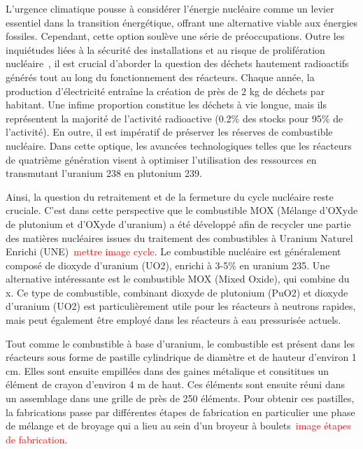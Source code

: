 L'urgence climatique pousse à considérer l'énergie nucléaire comme un levier essentiel dans la transition énergétique, offrant une alternative viable aux énergies fossiles. Cependant, cette option soulève une série de préoccupations. Outre les inquiétudes liées à la sécurité des installations et au risque de prolifération nucléaire~\cite{npt_resolution}, il est crucial d'aborder la question des déchets hautement radioactifs générés tout au long du fonctionnement des réacteurs. Chaque année, la production d'électricité entraîne la création de près de 2 kg de déchets par habitant. Une infime proportion constitue les déchets à vie longue, mais ils représentent la majorité de l'activité radioactive (0.2\% des stocks pour 95\% de l'activité). En outre, il est impératif de préserver les réserves de combustible nucléaire. Dans cette optique, les avancées technologiques telles que les réacteurs de quatrième génération visent à optimiser l'utilisation des ressources en transmutant l'uranium 238 en plutonium 239.

Ainsi, la question du retraitement et de la fermeture du cycle nucléaire reste cruciale. C'est dans cette perspective que le combustible MOX (Mélange d’OXyde de plutonium et d’OXyde d’uranium) a été développé afin de recycler une partie des matières nucléaires issues du traitement des combustibles à Uranium Naturel Enrichi (UNE)~\textcolor{red}{mettre image cycle}.
Le combustible nucléaire est généralement composé de dioxyde d'uranium (UO2), enrichi à 3-5\% en uranium 235. Une alternative intéressante est le combustible MOX (Mixed Oxide), qui combine du x.
Ce type de combustible, combinant dioxyde de plutonium (PuO2) et dioxyde d'uranium (UO2) est particulièrement utile pour les réacteurs à neutrons rapides, mais peut également être employé dans les réacteurs à eau pressurisée actuels.


Tout comme le combustible à base d'uranium, le combustible est présent dans les réacteurs sous forme de pastille cylindrique de diamètre et de hauteur d'environ 1 cm. Elles sont ensuite empillées dans des gaines métalique et consititues un élément de crayon d'environ 4 m de haut. Ces éléments sont ensuite réuni dans un assemblage dans une grille de près de 250 éléments. Pour obtenir ces pastilles, la fabrications passe par différentes étapes de fabrication en particulier une phase de mélange et de broyage qui a lieu au sein d'un broyeur à boulets~\textcolor{red}{image étapes de fabrication}.

